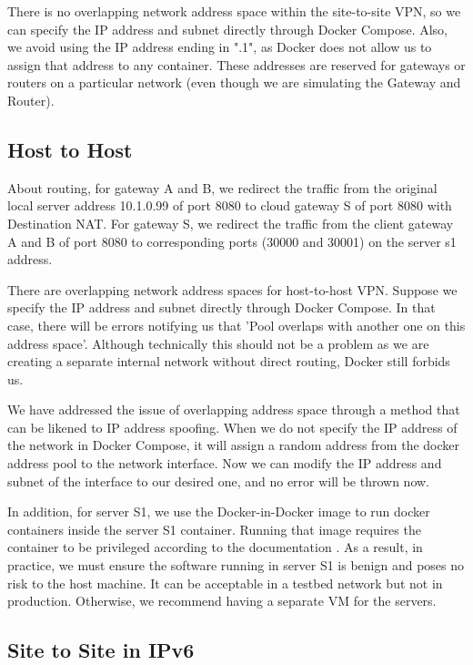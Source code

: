 \documentclass[article]{aaltoseries}
\begin{document}
There is no overlapping network address space within the site-to-site VPN, so we can specify the IP address and subnet directly through Docker Compose. Also, we avoid using the IP address ending in ".1", as Docker does not allow us to assign that address to any container. These addresses are reserved for gateways or routers on a particular network (even though we are simulating the Gateway and Router).

\subsection{Host to Host}

About routing, for gateway A and B, we redirect the traffic from the original local server address 10.1.0.99 of port 8080 to cloud gateway S of port 8080 with Destination NAT. For gateway S, we redirect the traffic from the client gateway A and B of port 8080 to corresponding ports (30000 and 30001) on the server s1 address.

There are overlapping network address spaces for host-to-host VPN. Suppose we specify the IP address and subnet directly through Docker Compose. In that case, there will be errors notifying us that 'Pool overlaps with another one on this address space'. Although technically this should not be a problem as we are creating a separate internal network without direct routing, Docker still forbids us.

We have addressed the issue of overlapping address space through a method that can be likened to IP address spoofing. When we do not specify the IP address of the network in Docker Compose, it will assign a random address from the docker address pool to the network interface. Now we can modify the IP address and subnet of the interface to our desired one, and no error will be thrown now.

In addition, for server S1, we use the Docker-in-Docker image to run docker containers inside the server S1 container. Running that image requires the container to be privileged according to the documentation \cite{Docker}. As a result, in practice, we must ensure the software running in server S1 is benign and poses no risk to the host machine. It can be acceptable in a testbed network but not in production. Otherwise, we recommend having a separate VM for the servers.

\subsection{Site to Site in IPv6}
\end{document}
